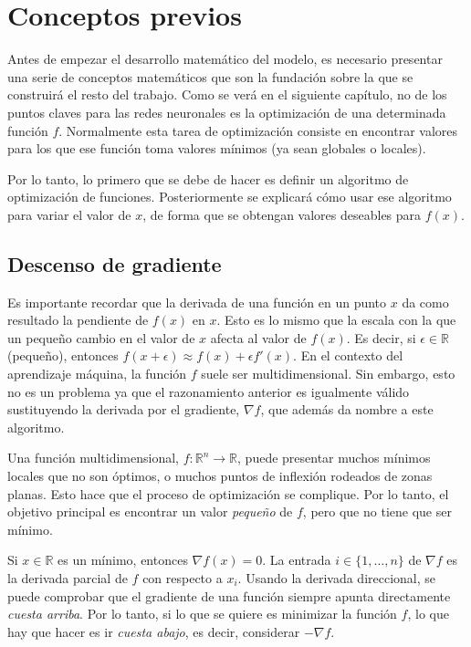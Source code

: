 \chapter{Conceptos previos}

Antes de empezar el desarrollo matemático del modelo, es necesario presentar una serie de conceptos
matemáticos que son la fundación sobre la que se construirá el resto del trabajo. Como se verá en el
siguiente capítulo, no de los puntos claves para las redes neuronales es la
optimización de una determinada función $f$. Normalmente esta tarea de optimización consiste en encontrar valores
para los que ese función toma valores mínimos (ya sean globales o locales).

Por lo tanto, lo primero  que se debe de hacer es definir un algoritmo de optimización de funciones.
Posteriormente se explicará cómo usar ese algoritmo para variar el valor de $x$, de forma que se
obtengan valores deseables para $f(x)$.

\section{Descenso de gradiente}

Es importante recordar que la derivada de una función en un punto $x$ da como resultado la pendiente de
$f(x)$ en $x$. Esto es lo mismo que la escala con la que un pequeño cambio en el valor de $x$ afecta
al valor de $f(x)$. Es decir, si $\epsilon\in\mathbb{R}$ (pequeño), entonces
$f(x+\epsilon)\approx f(x)+\epsilon f'(x)$. En el contexto del aprendizaje máquina, la función $f$ suele
ser multidimensional. Sin embargo, esto no es un problema ya que el razonamiento anterior es igualmente válido
sustituyendo la derivada por el gradiente, $\nabla f$, que además da nombre a este algoritmo.

Una función multidimensional, $f \colon \mathbb{R}^n \longrightarrow \mathbb{R}$, puede presentar muchos
mínimos locales que no son óptimos, o muchos puntos de inflexión rodeados de zonas planas. Esto hace que
el proceso de optimización se complique. Por lo tanto, el objetivo principal es encontrar un valor \textit{pequeño}
de $f$, pero que no tiene que ser mínimo.

Si $x\in\mathbb{R}$ es un mínimo, entonces $\nabla f(x)=0$. La entrada $i\in\{1,\dots, n\}$ de
$\nabla f$ es la derivada parcial de $f$ con respecto a $x_i$. Usando la derivada direccional, se puede
comprobar que el gradiente de una función siempre apunta directamente \textit{cuesta arriba}. Por lo tanto,
si lo que se quiere es minimizar la función $f$, lo que hay que hacer es ir \textit{cuesta abajo}, es decir,
considerar $-\nabla f$.

